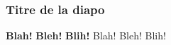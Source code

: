 \documentclass[hyperref={pdfpagemode=FullScreen,colorlinks=false}]{beamer}
\begin{document}
\begin{frame}
\frametitle{Titre de la diapo}
\textbf{Blah!}
\textbf<2>{Bleh!}
\textbf<3>{Blih!}
\alert{Blah!}
\alert<2>{Bleh!}
\alert<3>{Blih!}
\end{frame}
\end{document}
